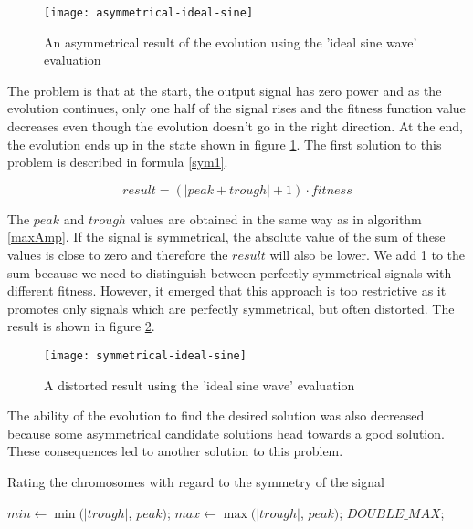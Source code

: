 \begin{figure}[H]
    \centerline{\texttt{[image: asymmetrical-ideal-sine]}\label{asymmetrical-ideal-sine}}
    \caption{An asymmetrical result of the evolution using the 'ideal sine wave' evaluation}
\end{figure}

The problem is that at the start, the output signal has zero power and as the evolution continues, only one half of the signal rises and the fitness function value decreases even though the evolution doesn't go in the right direction. At the end, the evolution ends up in the state shown in figure \ref{asymmetrical-ideal-sine}. The first solution to this problem is described in formula \ref{sym1}.

\begin{equation} \label{sym1}
result = (|peak + trough| + 1) \cdot fitness
\end{equation}

The $peak$ and $trough$ values are obtained in the same way as in algorithm \ref{maxAmp}. If the signal is symmetrical, the absolute value of the sum of these values is close to zero and therefore the $result$ will also be lower. We add 1 to the sum because we need to distinguish between perfectly symmetrical signals with different fitness. However, it emerged that this approach is too restrictive as it promotes only signals which are perfectly symmetrical, but often distorted. The result is shown in figure \ref{symmetrical-ideal-sine}.

\begin{figure}[H]
    \centerline{\texttt{[image: symmetrical-ideal-sine]}\label{symmetrical-ideal-sine}}
    \caption{A distorted result using the 'ideal sine wave' evaluation}
\end{figure}

The ability of the evolution to find the desired solution was also decreased because some asymmetrical candidate solutions head towards a good solution. These consequences led to another solution to this problem.

\begin{algorithm}
\caption{Rating the chromosomes with regard to the symmetry of the signal}
\label{symmetry-rating}
\begin{algorithmic}[1]
    \State $min \gets \min(|trough|$, $peak)$;
    \State $max \gets \max(|trough|$, $peak)$;
        \State \Return $DOUBLE\_MAX$;
    \EndIf
    \EndFunction
\end{algorithmic}
\end{algorithm}

